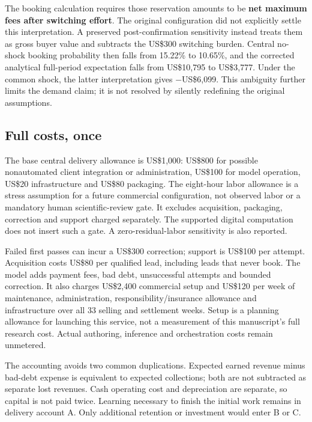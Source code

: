 \documentclass[
  11pt,
  letterpaper,
]{article}
\begin{document}
The booking calculation requires those reservation amounts to be
\textbf{net maximum fees after switching effort}. The original
configuration did not explicitly settle this interpretation. A preserved
post-confirmation sensitivity instead treats them as gross buyer value
and subtracts the US\$300 switching burden. Central no-shock booking
probability then falls from 15.22\% to 10.65\%, and the corrected
analytical full-period expectation falls from US\$10,795 to US\$3,777.
Under the common shock, the latter interpretation gives −US\$6,099. This
ambiguity further limits the demand claim; it is not resolved by
silently redefining the original assumptions.

\hypertarget{full-costs-once}{%
\subsection{Full costs, once}\label{full-costs-once}}

The base central delivery allowance is US\$1,000: US\$800 for possible
nonautomated client integration or administration, US\$100 for model
operation, US\$20 infrastructure and US\$80 packaging. The eight-hour
labor allowance is a stress assumption for a future commercial
configuration, not observed labor or a mandatory human scientific-review
gate. It excludes acquisition, packaging, correction and support charged
separately. The supported digital computation does not insert such a
gate. A zero-residual-labor sensitivity is also reported.

Failed first passes can incur a US\$300 correction; support is US\$100
per attempt. Acquisition costs US\$80 per qualified lead, including
leads that never book. The model adds payment fees, bad debt,
unsuccessful attempts and bounded correction. It also charges US\$2,400
commercial setup and US\$120 per week of maintenance, administration,
responsibility/insurance allowance and infrastructure over all 33
selling and settlement weeks. Setup is a planning allowance for
launching this service, not a measurement of this manuscript's full
research cost. Actual authoring, inference and orchestration costs
remain unmetered.

The accounting avoids two common duplications. Expected earned revenue
minus bad-debt expense is equivalent to expected collections; both are
not subtracted as separate lost revenues. Cash operating cost and
depreciation are separate, so capital is not paid twice. Learning
necessary to finish the initial work remains in delivery account A. Only
additional retention or investment would enter B or C.
\end{document}
